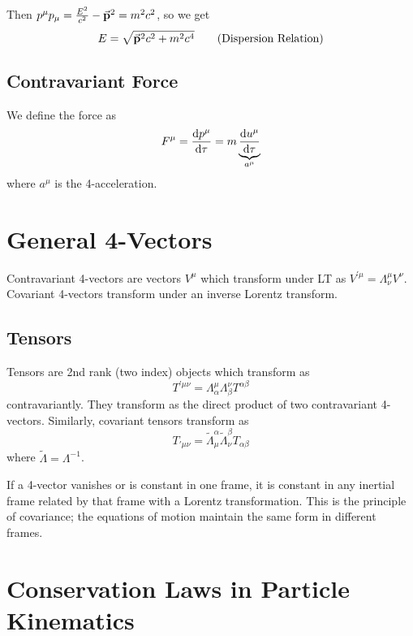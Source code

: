 \documentclass[a4paper,twoside,master.tex]{subfiles}
\begin{document}
Then $ p^{\mu} p_{\mu} = \frac{E^2}{c^2} - \va{p}^2 = m^2 c^2 $, so we get
\begin{equation}
    E = \sqrt{\va{p}^2 c^2 + m^2 c^4}\tag{Dispersion Relation}
\end{equation}

\subsection{Contravariant Force}\label{sub:contravariant_force}

We define the force as
\begin{equation}
    F^{\mu} = \dv{p^{\mu}}{\tau} = m \underbrace{\dv{u^{\mu}}{\tau}}_{a^{\mu}}
\end{equation}
where $ a^{\mu} $ is the 4-acceleration.


\section{General 4-Vectors}\label{sec:general_contravariant_4-vectors}

Contravariant 4-vectors are vectors $ V^{\mu} $ which transform under LT as $ V^{\prime \mu} = \Lambda^{\mu}_{\nu} V^{\nu} $. Covariant 4-vectors transform under an inverse Lorentz transform.

\subsection{Tensors}\label{sub:tensors}

Tensors are 2nd rank (two index) objects which transform as
\begin{equation}
    T^{\prime \mu \nu} = \Lambda^{\mu}_{\alpha} \Lambda^{\nu}_{\beta} T^{\alpha \beta}
\end{equation}
contravariantly. They transform as the direct product of two contravariant 4-vectors. Similarly, covariant tensors transform as
\begin{equation}
    T_{\prime \mu \nu} = \tilde{\Lambda}_{\mu}^{\alpha} \tilde{\Lambda}_{\nu}^{\beta} T_{\alpha \beta}
\end{equation}
where $ \tilde{\Lambda} = \Lambda^{-1} $.

If a 4-vector vanishes or is constant in one frame, it is constant in any inertial frame related by that frame with a Lorentz transformation. This is the principle of covariance; the equations of motion maintain the same form in different frames.

\section{Conservation Laws in Particle Kinematics}\label{sec:conservation_laws_in_particle_kinematics}
\end{document}
